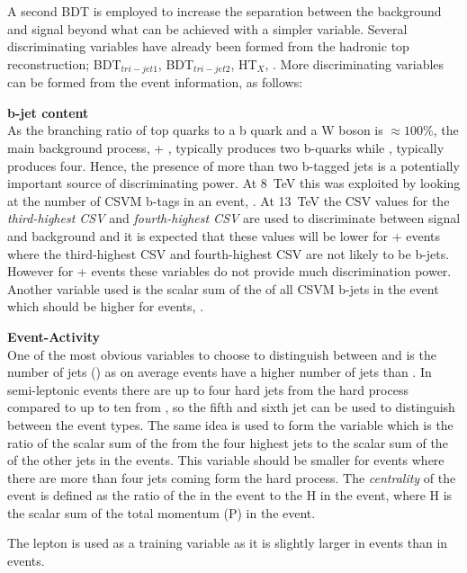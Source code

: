 A second BDT is employed to increase the separation between the \ttbar background and \tttt signal beyond what can be achieved with a simpler variable. Several discriminating variables have already been formed from the hadronic top reconstruction; BDT$_{tri-jet1}$, BDT$_{tri-jet2}$, HT$_{X}$, \sumjetmassX. More discriminating variables can be formed from the event information, as follows:

\textbf{b-jet content}\\
As the branching ratio of top quarks to a b quark and a W boson is $\approx 100\%$, the main background process, \ttbar + \llbar,  typically produces two b-quarks while \tttt, typically produces four. Hence, the presence of more than two b-tagged jets is a potentially important source of discriminating power.
At 8~TeV this was exploited by looking at the number of CSVM b-tags in an event, \nMtags. At 13~TeV the CSV values for the \emph{third-highest CSV} and \emph{fourth-highest CSV} are used to discriminate between signal and background and it is expected that these values will be lower for \ttbar + \llbar events where the third-highest CSV and fourth-highest CSV are not likely to be b-jets. However for \ttbar + \bbbar events these variables do not provide much discrimination power.
Another variable used is the scalar sum of the \HT of all CSVM b-jets in the event which should be higher for \tttt events, \htb.

\textbf{Event-Activity}\\
One of the most obvious variables to choose to distinguish between \ttbar and \tttt is the number of jets (\njets) as on average \tttt events have a higher number of jets than \ttbar. In semi-leptonic \ttbar events there are up to four hard jets from the hard process compared to up to ten from \tttt, so the fifth and sixth jet \pt can be used to distinguish between the event types. The same idea is used to form the variable \htrat which is the ratio of the scalar sum of the \HT from the four highest \pt jets to the scalar sum of the \HT of the other jets in the events. This variable should be smaller for \tttt events where there are more than four jets coming form the hard process.
The \emph{centrality} of the event is defined as the ratio of the \HT in the event to the H in the event, where H is the scalar sum of the total momentum (P) in the event.

The lepton \pt is used as a training variable as it is slightly larger in \tttt events than in \ttbar events.

